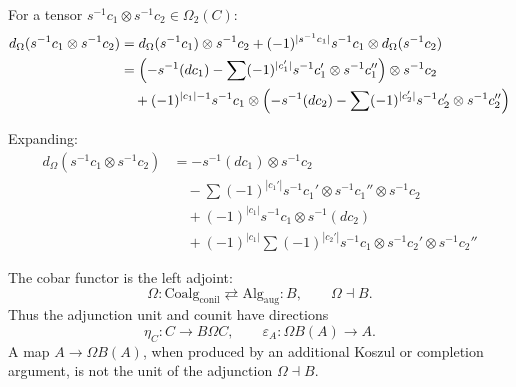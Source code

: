 \begin{computation}
\label{comp:cobar-signs-2-3}
For a tensor $s^{-1}c_1 \otimes s^{-1}c_2 \in \Omega_2(C)$:
\begin{align*}
d_\Omega(s^{-1}c_1 \otimes s^{-1}c_2) &= d_\Omega(s^{-1}c_1) \otimes s^{-1}c_2
 + (-1)^{|s^{-1}c_1|} s^{-1}c_1 \otimes d_\Omega(s^{-1}c_2) \\
&= \Bigl( -s^{-1}(dc_1) - \sum (-1)^{|c_1'|} s^{-1}c_1' \otimes s^{-1}c_1'' \Bigr) \otimes s^{-1}c_2 \\
&\quad + (-1)^{|c_1|-1} s^{-1}c_1 \otimes \Bigl( -s^{-1}(dc_2) - \sum (-1)^{|c_2'|} s^{-1}c_2' \otimes s^{-1}c_2'' \Bigr)
\end{align*}

Expanding:
\begin{align*}
d_\Omega(s^{-1}c_1 \otimes s^{-1}c_2) &= -s^{-1}(dc_1) \otimes s^{-1}c_2 \\
&\quad - \sum (-1)^{|c_1'|} s^{-1}c_1' \otimes s^{-1}c_1'' \otimes s^{-1}c_2 \\
&\quad + (-1)^{|c_1|} s^{-1}c_1 \otimes s^{-1}(dc_2) \\
&\quad + (-1)^{|c_1|} \sum (-1)^{|c_2'|} s^{-1}c_1 \otimes s^{-1}c_2' \otimes s^{-1}c_2''
\end{align*}
\end{computation}

\begin{convention}
\label{conv:bar-cobar-adjunction-direction}
The cobar functor is the left adjoint:
\[
\Omega:\mathrm{Coalg}_{\mathrm{conil}}\rightleftarrows
\mathrm{Alg}_{\mathrm{aug}}:B,\qquad \Omega\dashv B.
\]
Thus the adjunction unit and counit have directions
\[
\eta_C:C\longrightarrow B\Omega C,\qquad
\varepsilon_A:\Omega B(A)\longrightarrow A.
\]
A map $A\to\Omega B(A)$, when produced by an additional Koszul or
completion argument, is not the unit of the adjunction
$\Omega\dashv B$.
\end{convention}

